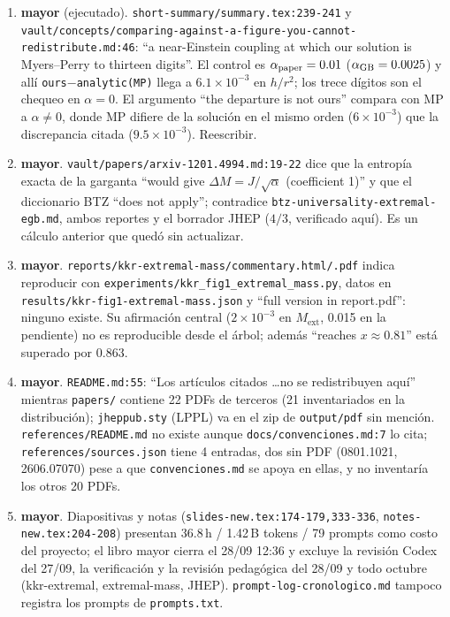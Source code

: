 \documentclass[10pt,a4paper]{article}
\newcommand{\MAY}{\textcolor{may}{\textbf{mayor}}}
\newcommand{\code}[1]{\texttt{#1}}
\newcommand{\ext}{\mathrm{ext}}
\begin{document}
\begin{enumerate}[label=D\arabic*.,leftmargin=2.4em]
\item \MAY{} (ejecutado). \code{short-summary/summary.tex:239-241} y
 \code{vault/concepts/comparing-against-a-figure-you-cannot-redistribute.md:46}: ``a near-Einstein
 coupling at which our solution is Myers--Perry to thirteen digits''. El control es
 $\alpha_{\rm paper}=0.01$ ($\alpha_{\rm GB}=0.0025$) y allí \code{ours$-$analytic(MP)} llega a
 $6.1\times10^{-3}$ en $h/r^2$; los trece dígitos son el chequeo en $\alpha=0$. El argumento ``the
 departure is not ours'' compara con MP a $\alpha\ne0$, donde MP difiere de la solución en el mismo
 orden ($6\times10^{-3}$) que la discrepancia citada ($9.5\times10^{-3}$). Reescribir.
\item \MAY. \code{vault/papers/arxiv-1201.4994.md:19-22} dice que la entropía exacta de la garganta
 ``would give $\Delta M=J/\sqrt\alpha$ (coefficient 1)'' y que el diccionario BTZ ``does not apply'';
 contradice \code{btz-universality-extremal-egb.md}, ambos reportes y el borrador JHEP ($4/3$,
 verificado aquí). Es un cálculo anterior que quedó sin actualizar.
\item \MAY. \code{reports/kkr-extremal-mass/commentary.html/.pdf} indica reproducir con
 \code{experiments/kkr\_fig1\_extremal\_mass.py}, datos en \code{results/kkr-fig1-extremal-mass.json}
 y ``full version in report.pdf'': ninguno existe. Su afirmación central ($2\times10^{-3}$ en
 $M_\ext$, 0.015 en la pendiente) no es reproducible desde el árbol; además ``reaches $x\approx0.81$''
 está superado por $0.863$.
\item \MAY. \code{README.md:55}: ``Los artículos citados \ldots no se redistribuyen aquí'' mientras
 \code{papers/} contiene 22 PDFs de terceros (21 inventariados en la distribución);
 \code{jheppub.sty} (LPPL) va en el zip de \code{output/pdf} sin mención. \code{references/README.md}
 no existe aunque \code{docs/convenciones.md:7} lo cita; \code{references/sources.json} tiene 4
 entradas, dos sin PDF (0801.1021, 2606.07070) pese a que \code{convenciones.md} se apoya en ellas, y
 no inventaría los otros 20 PDFs.
\item \MAY. Diapositivas y notas (\code{slides-new.tex:174-179,333-336},
 \code{notes-new.tex:204-208}) presentan 36.8\,h / 1.42\,B tokens / 79 prompts como costo del
 proyecto; el libro mayor cierra el 28/09 12:36 y excluye la revisión Codex del 27/09, la
 verificación y la revisión pedagógica del 28/09 y todo octubre (kkr-extremal, extremal-mass, JHEP).
 \code{prompt-log-cronologico.md} tampoco registra los prompts de \code{prompts.txt}.

\end{enumerate}
\end{document}
